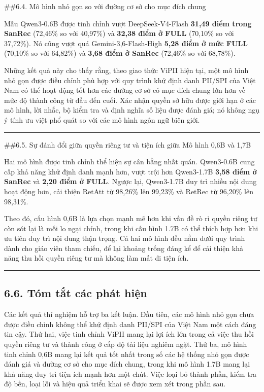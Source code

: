 \documentclass[
  11pt,
  a4paper,
]{article}
\begin{document}
\#\#6.4. Mô hình nhỏ gọn so với đường cơ sở cho mục đích chung

Mẫu Qwen3-0.6B được tinh chỉnh vượt DeepSeek-V4-Flash \textbf{31,49 điểm
trong SanRec} (72,46\% so với 40,97\%) và \textbf{32,38 điểm ở FULL}
(70,10\% so với 37,72\%). Nó cũng vượt quá Gemini-3,6-Flash-High
\textbf{5,28 điểm ở mức FULL} (70,10\% so với 64,82\%) và \textbf{3,68
điểm ở SanRec} (72,46\% so với 68,78\%).

Những kết quả này cho thấy rằng, theo giao thức ViPII hiện tại, một mô
hình nhỏ gọn được điều chỉnh phù hợp với quy trình khử định danh PII/SPI
của Việt Nam có thể hoạt động tốt hơn các đường cơ sở có mục đích chung
lớn hơn về mức độ thành công từ đầu đến cuối. Xác nhận quyền sở hữu được
giới hạn ở các mô hình, lời nhắc, bộ kiểm tra và định nghĩa số liệu được
đánh giá; nó không ngụ ý tính ưu việt phổ quát so với các mô hình ngôn
ngữ biên giới.

\begin{center}\rule{0.5\linewidth}{0.5pt}\end{center}

\#\#6.5. Sự đánh đổi giữa quyền riêng tư và tiện ích giữa Mô hình 0,6B
và 1,7B

Hai mô hình được tinh chỉnh thể hiện sự cân bằng nhất quán. Qwen3-0.6B
cung cấp khả năng khử định danh mạnh hơn, vượt trội hơn Qwen3-1.7B
\textbf{3,58 điểm ở SanRec} và \textbf{2,20 điểm ở FULL}. Ngược lại,
Qwen3-1.7B duy trì nhiều nội dung hoạt động hơn, cải thiện RetAtt từ
98,26\% lên 99,23\% và RetRec từ 96,20\% lên 98,31\%.

Theo đó, cấu hình 0,6B là lựa chọn mạnh mẽ hơn khi vấn đề rò rỉ quyền
riêng tư còn sót lại là mối lo ngại chính, trong khi cấu hình 1.7B có
thể thích hợp hơn khi ưu tiên duy trì nội dung thận trọng. Cả hai mô
hình đều nằm dưới quy trình dành cho giáo viên tham chiếu, để lại khoảng
trống đáng kể để cải thiện khả năng thu hồi quyền riêng tư mà không làm
mất đi tiện ích.

\begin{center}\rule{0.5\linewidth}{0.5pt}\end{center}

\subsection{6.6. Tóm tắt các phát
hiện}\label{tuxf3m-tux1eaft-cuxe1c-phuxe1t-hiux1ec7n}

Các kết quả thí nghiệm hỗ trợ ba kết luận. Đầu tiên, các mô hình nhỏ gọn
chưa được điều chỉnh không thể khử định danh PII/SPI của Việt Nam một
cách đáng tin cậy. Thứ hai, việc tinh chỉnh ViPII mang lại lợi ích lớn
trong cả việc thu hồi quyền riêng tư và thành công ở cấp độ tài liệu
nghiêm ngặt. Thứ ba, mô hình tinh chỉnh 0,6B mang lại kết quả tốt nhất
trong số các hệ thống nhỏ gọn được đánh giá và đường cơ sở cho mục đích
chung, trong khi mô hình 1.7B mang lại khả năng duy trì tiện ích mạnh
hơn một chút. Việc loại bỏ thành phần, kiểm tra độ bền, loại lỗi và hiệu
quả triển khai sẽ được xem xét trong phần sau.
\end{document}
